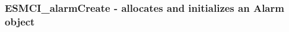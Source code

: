  
\setlength{\oldparskip}{\parskip}
\setlength{\parskip}{1.5ex}
\setlength{\oldparindent}{\parindent}
\setlength{\parindent}{0pt}
\setlength{\oldbaselineskip}{\baselineskip}
\setlength{\baselineskip}{11pt}
 
\def\bv{\begin{verbatim}}
\def\ev{\end{verbatim}}
\def\be{\begin{equation}}
\def\ee{\end{equation}}
\def\bea{\begin{eqnarray}}
\def\eea{\end{eqnarray}}
\def\bi{\begin{itemize}}
\def\ei{\end{itemize}}
\def\bn{\begin{enumerate}}
\def\en{\end{enumerate}}
\def\bd{\begin{description}}
\def\ed{\end{description}}
\def\({\left (}
\def\){\right )}
\def\[{\left [}
\def\]{\right ]}
\def\<{\left  \langle}
\def\>{\right \rangle}
\def\cI{{\cal I}}
\def\diag{\mathop{\rm diag}}
\def\tr{\mathop{\rm tr}}


 
\subsubsection [ESMCI\_alarmCreate] {ESMCI\_alarmCreate - allocates and initializes an Alarm object}


